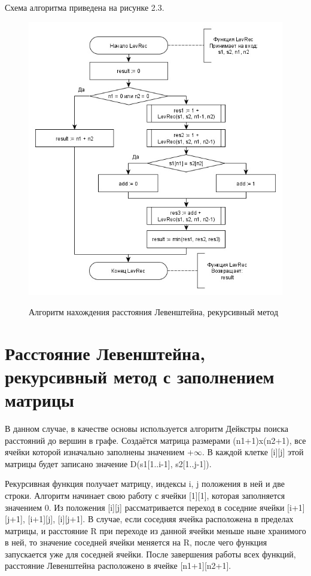 \documentclass[10pt,a4paper]{report}
\begin{document}
	Схема алгоритма приведена на рисунке 2.3.
	\begin{figure}[h]
		\begin{center}
			{\includegraphics[scale = 0.7]{Lev_rec}}
			\caption{Алгоритм нахождения расстояния Левенштейна, рекурсивный метод}
		\end{center}
	\end{figure}

	\section{Расстояние Левенштейна, рекурсивный метод с заполнением матрицы}
	В данном случае, в качестве основы используется алгоритм Дейкстры поиска расстояний до вершин в графе. Создаётся матрица размерами (n1+1)x(n2+1), все ячейки которой изначально заполнены значением +$\infty$. В каждой клетке [i][j] этой матрицы будет записано значение D(s1[1..i-1], s2[1..j-1]). 
	
	Рекурсивная функция получает матрицу, индексы i, j положения в ней и две строки. Алгоритм начинает свою работу с ячейки [1][1], которая заполняется значением 0. Из положения [i][j] рассматривается переход в соседние ячейки [i+1][j+1], [i+1][j], [i][j+1]. В случае, если соседняя ячейка расположена в пределах матрицы, и расстояние R при переходе из данной ячейки меньше ныне хранимого в ней, то значение соседней ячейки меняется на R, после чего функция запускается уже для соседней ячейки. После завершения работы всех функций, расстояние Левенштейна расположено в ячейке [n1+1][n2+1].
	
\end{document}
